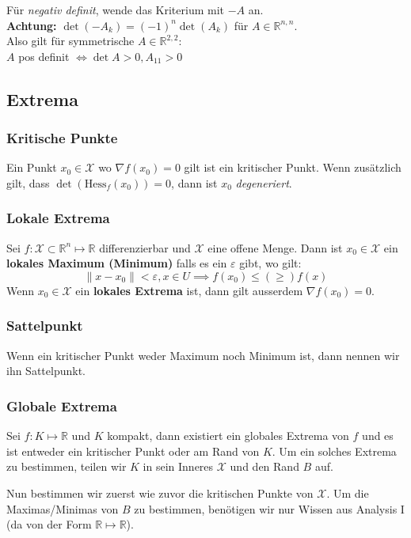 \documentclass[a4paper,10pt]{article}
\def\R{\mathbb{R}}
\def\X{\mathcal{X}}
\begin{document}
\noindent Für \textit{negativ definit}, wende das Kriterium mit $-A$ an. \\
\textbf{Achtung:} $\det(-A_k) =  (-1)^n\det(A_k)$ für $A\in \mathbb{R}^{n,n}$.\\

\noindent Also gilt für symmetrische $A\in \mathbb{R}^{2,2}$:  \\
$A$ pos definit $\iff \det A>0, A_{11}>0$ 
\subsection{Extrema}
\subsubsection*{Kritische Punkte}
Ein Punkt $x_0 \in \X$ wo $\nabla f(x_0) = 0$ gilt ist ein kritischer Punkt. Wenn zusätzlich gilt, dass $\det(\text{Hess}_f(x_0)) = 0$, dann ist $x_0$ \textit{degeneriert}.

\subsubsection*{Lokale Extrema}
Sei $f: \X \subset \R^n \mapsto \R$ differenzierbar und $\X$ eine offene Menge. Dann ist $x_0 \in \X$ ein \textbf{lokales Maximum (Minimum)} falls es ein $\varepsilon$ gibt, wo gilt:
$$\| x-x_{0} \|<\varepsilon, x \in U\implies f(x_{0})\leq (\geq) f(x)$$
Wenn $x_0 \in \X$ ein \textbf{lokales Extrema} ist, dann gilt ausserdem $\nabla f(x_0) = 0$.

\subsubsection*{Sattelpunkt}
Wenn ein kritischer Punkt weder Maximum noch Minimum ist, dann nennen wir ihn Sattelpunkt.

\subsubsection*{Globale Extrema}
Sei $f: K \mapsto \R$ und $K$ kompakt, dann existiert ein globales Extrema von $f$ und es ist entweder ein kritischer Punkt oder am Rand von $K$. Um ein solches Extrema zu bestimmen, teilen wir $K$ in sein Inneres $\X$ und den Rand $B$ auf. 

Nun bestimmen wir zuerst wie zuvor die kritischen Punkte von $\X$. Um die Maximas/Minimas von $B$ zu bestimmen, benötigen wir nur Wissen aus Analysis I (da von der Form $\R \mapsto \R$).
\end{document}
